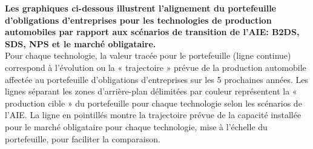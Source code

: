 \documentclass[10pt,table,a4]{article}\usepackage[]{graphicx}\usepackage[]{color}
\begin{document}
	\begin{multicols}{2}
		\textbf{Les graphiques ci-dessous illustrent l'alignement du portefeuille d’obligations d’entreprises pour les technologies de production automobiles par rapport aux scénarios de transition de l'AIE: B2DS, SDS, NPS et le marché obligataire.}\\ 
		Pour chaque technologie, la valeur tracée pour le portefeuille (ligne continue) correspond à l'évolution ou la « trajectoire » prévue de la production automobile affectée au portefeuille d’obligations d’entreprises sur les 5 prochaines années.
		Les lignes séparant les zones d'arrière-plan délimitées par couleur représentent la « production cible » du portefeuille pour chaque technologie selon les scénarios de l'AIE. La ligne en pointillés montre la trajectoire prévue de la capacité installée pour le marché obligataire pour chaque technologie, mise à l'échelle du portefeuille, pour faciliter la comparaison.
		                  
		
	\end{multicols}		
\end{document}
